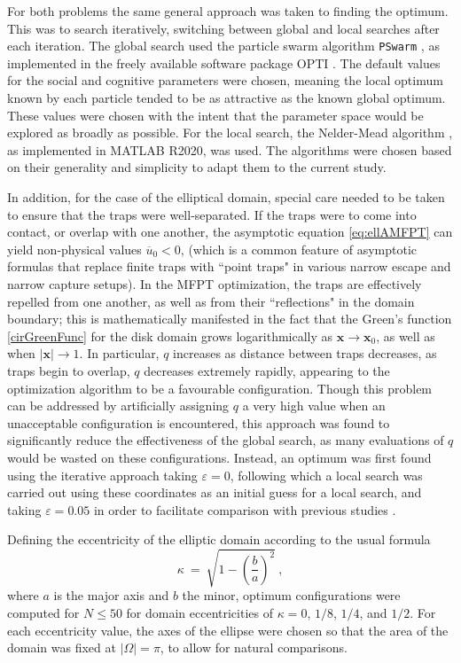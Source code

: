 \documentclass[11pt,letter,subeqn,fleqn]{article}
\newcommand{\es}{\ = \ }
\newcommand{\amfpt}{\overline{u}_0} %
\newcommand{\veps}{\varepsilon}     %
\newcommand{\trapLoc}{\mathbf{x}}   %
\newcommand{\domMeas}{|\Omega|}     %
\newcommand{\meritFunc}{q}          %
\newcommand{\ecc}{\kappa}
\begin{document}
For both problems the same general approach was taken to finding the optimum. This was to search iteratively, switching between global and local searches after each iteration. The global search used the particle swarm algorithm \texttt{PSwarm} \cite{vaz2007particle}, as implemented in the freely available software package OPTI \cite{currie2012opti}. The default values for the social and cognitive parameters were chosen, meaning the local optimum known by each particle tended to be as attractive as the known global optimum. These values were chosen with the intent that the parameter space would be explored as broadly as possible. For the local search, the Nelder-Mead algorithm \cite{lagarias1998convergence}, as implemented in MATLAB R2020, was used. The algorithms were chosen based on their generality and simplicity to adapt them to the current study.

In addition, for the case of the elliptical domain, special care needed to be taken to ensure that the traps were well-separated. If the traps were to come into contact, or overlap with one another, the asymptotic equation \eqref{eq:ellAMFPT} can yield non-physical values $\amfpt < 0$, (which is a common feature of asymptotic formulas that replace finite traps with ``point traps" in various narrow escape and narrow capture setups). In the MFPT optimization, the traps are effectively repelled from one another, as well as from their ``reflections" in the domain boundary; this is mathematically manifested in the fact that the Green's function \eqref{cirGreenFunc} for the disk domain grows logarithmically as $\trapLoc\to \trapLoc_0$, as well as when $|\trapLoc|\to 1$. In particular, $\meritFunc$ increases as distance between traps decreases, as traps begin to overlap, $\meritFunc$ decreases extremely rapidly, appearing to the optimization algorithm to be a favourable configuration. Though this problem can be addressed by artificially assigning $\meritFunc$ a very high value when an unacceptable configuration is encountered, this approach was found to significantly reduce the effectiveness of the global search, as many evaluations of $\meritFunc$ would be wasted on these configurations. Instead, an optimum was first found using the iterative approach taking $\veps = 0$, following which a local search was carried out using these coordinates as an initial guess for a local search, and taking $\veps = 0.05$ in order to facilitate comparison with previous studies \cite{iyaniwura2020optimization}.

Defining the eccentricity of the elliptic domain according to the usual formula
\begin{equation} \label{eq:eccDef}
\ecc \es \sqrt{1 - \left( \dfrac{b}{a} \right)^2} \ ,
\end{equation}
where $a$ is the major axis and $b$ the minor, optimum configurations were computed for $N \leq 50$ for domain eccentricities of $\ecc = 0$, $1/8$, $1/4$, and $1/2$. For each eccentricity value, the axes of the ellipse were chosen so that the area of the domain was fixed at $\domMeas = \pi$, to allow for natural comparisons.
\end{document}
